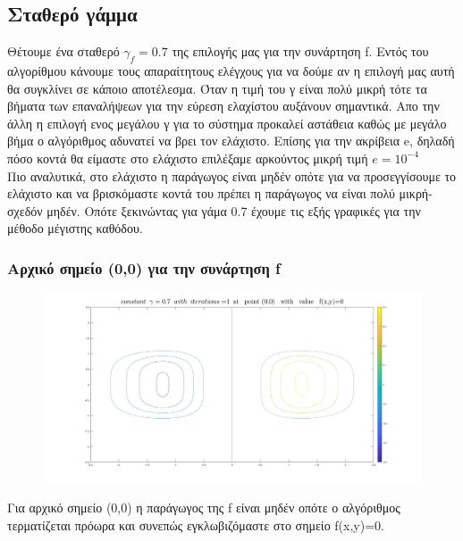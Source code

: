 \documentclass{article}
\begin{document}
\subsection*{Σταθερό γάμμα}
Θέτουμε ένα σταθερό $\boxed{γ_f=0.7}$ της επιλογής μας για την συνάρτηση f. Εντός του αλγορίθμου κάνουμε τους απαραίτητους ελέγχους για να δούμε αν η επιλογή μας αυτή θα συγκλίνει σε κάποιο αποτέλεσμα. Όταν η τιμή του γ είναι πολύ μικρή τότε τα βήματα των επαναλήψεων για την εύρεση ελαχίστου αυξάνουν σημαντικά. Απο την άλλη η επιλογή ενος μεγάλου γ για το σύστημα προκαλεί αστάθεια καθώς με μεγάλο βήμα ο αλγόριθμος αδυνατεί να βρει τον ελάχιστο. Επίσης για την ακρίβεια e, δηλαδή πόσο κοντά θα είμαστε στο ελάχιστο επιλέξαμε αρκούντος μικρή τιμή $\boxed{e = 10^{-4}}$\\Πιο αναλυτικά, στο ελάχιστο η παράγωγος είναι μηδέν οπότε για να προσεγγίσουμε το ελάχιστο και να βρισκόμαστε κοντά του πρέπει η παράγωγος να είναι πολύ μικρή-σχεδόν μηδέν. 
Οπότε ξεκινώντας για γάμα 0.7 έχουμε τις εξής γραφικές για την μέθοδο μέγιστης καθόδου.
\clearpage
\subsubsection*{Αρχικό σημείο (0,0) για την συνάρτηση f}
\begin{figure}[h!]	
     \centering  
     \advance\leftskip-0.2cm  
  \includegraphics[width=140mm,scale=2]{t1a.jpg}
\end{figure} 
Για αρχικό σημείο (0,0) η παράγωγος της f είναι μηδέν οπότε ο αλγόριθμος τερματίζεται πρόωρα και συνεπώς εγκλωβιζόμαστε στο σημείο f(x,y)=0.
\end{document}
